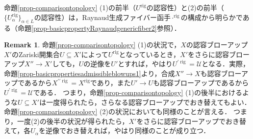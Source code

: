 \documentclass[a4paper,12pt, dvipdfmx]{jsbook}
\def\rig{\mathop{\mathrm{rig}}\nolimits}
\theoremstyle{plain}
\theoremstyle{definition}
\newtheorem{rem}[thm]{\bfseries Remark}
\begin{document}
命題\ref{prop-comparisontopology} (1)の前半（$U^{\rig}$の認容性）と(2)の前半（$\{U^{\rig}_{\alpha}\}_{\alpha\in L}$の認容性）は，Raynaud生成ファイバー函手$\cdot^{\rig}$の構成から明らかである（命題\ref{prop-basicpropertyRaynaudgenericfiber2}参照）．

\begin{rem}\label{rem-comparisontopology}{\rm 
命題\ref{prop-comparisontopology} (1)の状況で，$X$の認容ブローアップ$X'$のZariski開集合$U\subseteq X'$によって$U^{\rig}$となっているとき，$X'$をさらに認容ブローアップ$X''\rightarrow X'$しても，$U$の逆像を$U'$とすれば，やはり$U^{\prime\rig}=\mathcal{U}$となる．実際，命題\ref{prop-basicpropertiesadmissibleblowups1}より，合成$X''\rightarrow X$も認容ブローアップであるから$X^{\prime\prime\rig}=X^{\rig}$であり，また$U'\rightarrow U$も認容ブローアップであるから$U^{\prime\rig}=\mathcal{U}$である．
つまり，命題\ref{prop-comparisontopology} (1)の後半におけるような$U\subseteq X'$は一度得られたら，さらなる認容ブローアップでおき替えてもよい．
命題\ref{prop-comparisontopology} (2)の状況においても同様のことが言える．
つまり，一度(2)の後半の状況が得られたら，$X'$をさらに認容ブローアップでおき替えて，各$U_{\alpha}$を逆像でおき替えれば，やはり同様のことが成り立つ．}
\end{rem}
\end{document}
